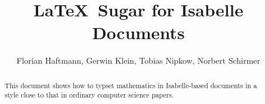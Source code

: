 \documentclass[11pt,a4paper]{article}
\begin{document}
\title{\LaTeX\ Sugar for Isabelle Documents}
\author{Florian Haftmann, Gerwin Klein, Tobias Nipkow, Norbert Schirmer}
\maketitle

\begin{abstract}
This document shows how to typset mathematics in Isabelle-based
documents in a style close to that in ordinary computer science papers.
\end{abstract}






\end{document}

